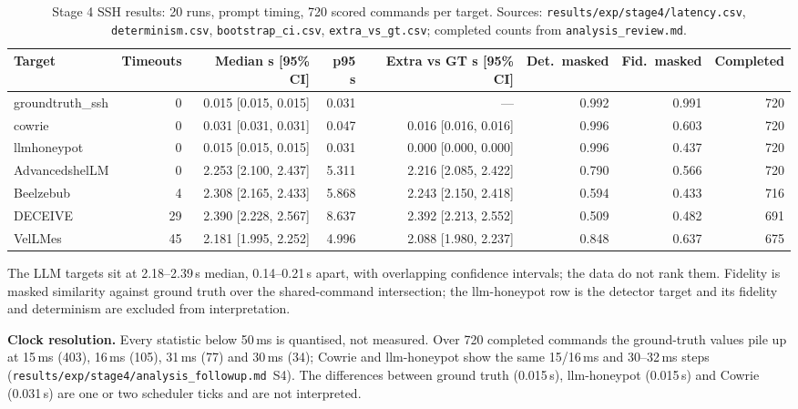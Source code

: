 \documentclass[a4paper,11pt]{article}
\begin{document}
\begin{table}[ht]
\centering
\caption{Stage 4 SSH results: 20 runs, prompt timing, 720 scored commands per
target. Sources: \texttt{results/exp/stage4/latency.csv},
\texttt{determinism.csv}, \texttt{bootstrap\_ci.csv},
\texttt{extra\_vs\_gt.csv}; completed counts from
\texttt{analysis\_review.md}.}
\label{tab:s4-ssh}
\scriptsize
\setlength{\tabcolsep}{4pt}
\begin{tabular}{@{}l r r r r r r r@{}}
\toprule
Target & Timeouts & Median s [95\% CI] & p95 s & Extra vs GT s [95\% CI] & Det.\ masked & Fid.\ masked & Completed \\
\midrule
groundtruth\_ssh & 0 & 0.015 [0.015, 0.015] & 0.031 & --- & 0.992 & 0.991 & 720 \\
cowrie & 0 & 0.031 [0.031, 0.031] & 0.047 & 0.016 [0.016, 0.016] & 0.996 & 0.603 & 720 \\
llmhoneypot & 0 & 0.015 [0.015, 0.015] & 0.031 & 0.000 [0.000, 0.000] & 0.996 & 0.437 & 720 \\
AdvancedshelLM & 0 & 2.253 [2.100, 2.437] & 5.311 & 2.216 [2.085, 2.422] & 0.790 & 0.566 & 720 \\
Beelzebub & 4 & 2.308 [2.165, 2.433] & 5.868 & 2.243 [2.150, 2.418] & 0.594 & 0.433 & 716 \\
DECEIVE & 29 & 2.390 [2.228, 2.567] & 8.637 & 2.392 [2.213, 2.552] & 0.509 & 0.482 & 691 \\
VelLMes & 45 & 2.181 [1.995, 2.252] & 4.996 & 2.088 [1.980, 2.237] & 0.848 & 0.637 & 675 \\
\bottomrule
\end{tabular}
\end{table}

The LLM targets sit at 2.18--2.39\,s median, 0.14--0.21\,s apart, with
overlapping confidence intervals; the data do not rank them. Fidelity is
masked similarity against ground truth over the shared-command intersection;
the llm-honeypot row is the detector target and its fidelity and determinism
are excluded from interpretation.

\textbf{Clock resolution.} Every statistic below 50\,ms is quantised, not
measured. Over 720 completed commands the ground-truth values pile up at
15\,ms (403), 16\,ms (105), 31\,ms (77) and 30\,ms (34); Cowrie and llm-honeypot
show the same 15/16\,ms and 30--32\,ms steps
(\texttt{results/exp/stage4/analysis\_followup.md}~S4). The differences between
ground truth (0.015\,s), llm-honeypot (0.015\,s) and Cowrie (0.031\,s) are one
or two scheduler ticks and are not interpreted.
\end{document}

